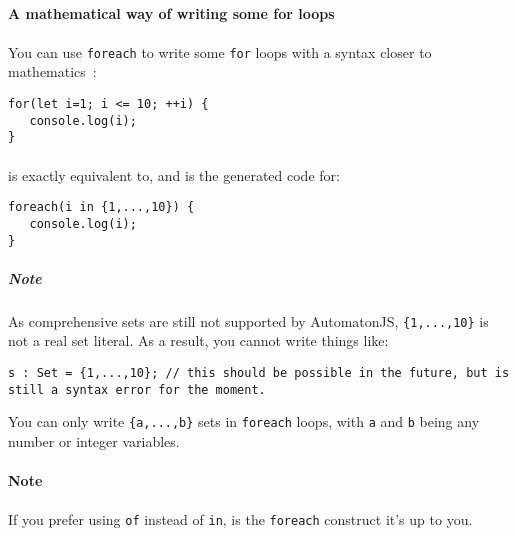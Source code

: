 \documentclass{article}
\let\subsubsubsection\paragraph
\let\subsubsubsubsection\subparagraph
\begin{document}
\begin{sloppypar}
\subsubsubsection{ A mathematical way of writing some for loops\\}
\paragraph{}
You can use \lstinline!foreach! to write some \lstinline!for! loops with a syntax closer to mathematics :
            
{\begin{lstlisting}
for(let i=1; i <= 10; ++i) {
   console.log(i);
}
\end{lstlisting}
}


            
\paragraph{}
is exactly equivalent to, and is the generated code for:

{\begin{lstlisting}
foreach(i in {1,...,10}) {
   console.log(i);
}
\end{lstlisting}
}

            
            

\subsubsubsubsection{ Note\\}
\paragraph{}
As comprehensive sets are still not supported by AutomatonJS, \lstinline!{1,...,10}! is not a real set literal. As a result, you cannot write things like:
{\begin{lstlisting}
s : Set = {1,...,10}; // this should be possible in the future, but is still a syntax error for the moment.
\end{lstlisting}
}

               You can only write \lstinline!{a,...,b}! sets in \lstinline!foreach! loops, with \lstinline!a! and \lstinline!b! being any number or integer variables.
            
         
         
         

\subsubsubsection{ Note\\}
\paragraph{}
If you prefer using \lstinline!of! instead of \lstinline!in!, is  the \lstinline!foreach! construct it's up to you.
         

\end{sloppypar}
\end{document}
